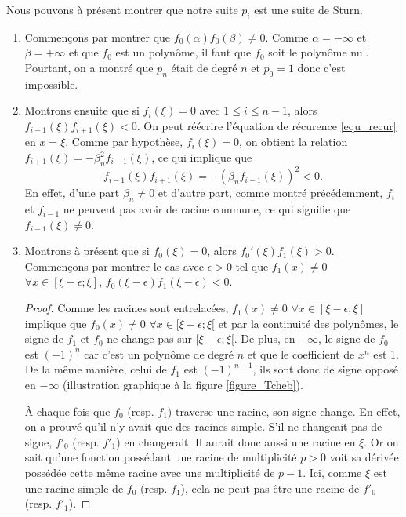 	Nous pouvons à présent montrer que notre suite $p_i$ est une suite de Sturn. 
\begin{enumerate}
  \item Commençons par montrer que $f_0(\alpha)f_0(\beta) \neq 0$.
    Comme $\alpha = -\infty$ et $\beta = + \infty$ et que $f_0$ est un polynôme,
    il faut que $f_0$ soit le polynôme nul.
    Pourtant, on a montré que $p_n$ était de degré $n$ et $p_0 = 1$ donc
    c'est impossible.
  \item Montrons ensuite que si $f_i(\xi) = 0$ avec $1 \leq i \leq n-1$,
    alors $f_{i-1}(\xi)f_{i+1}(\xi) < 0$.
    On peut réécrire l'équation de récurence \ref{equ_recur} en $x=\xi$.
    Comme par hypothèse, $f_i(\xi)=0$, on obtient la relation
    $f_{i+1}(\xi) = -\beta_n^2f_{i-1}(\xi)$, ce qui implique que
    \[ f_{i-1}(\xi)f_{i+1}(\xi) = -(\beta_nf_{i-1}(\xi))^2 < 0. \]
    En effet, d'une part $\beta_n \neq 0$ et d'autre part, comme montré précédemment, $f_i$ et $f_{i-1}$ ne peuvent
    pas avoir de racine commune, ce qui signifie que $f_{i-1}(\xi) \neq 0$.
  \item Montrons à présent que si $f_0(\xi) = 0$,
    alors $f_0'(\xi)f_1(\xi) > 0$.
    Commençons par montrer le cas avec $\epsilon > 0$ tel que
    $f_1(x) \neq 0$ $\forall x \in [\xi - \epsilon; \xi]$,
    $f_0(\xi-\epsilon) f_1(\xi-\epsilon) < 0$.
    
    \begin{proof}
      Comme les racines sont entrelacées,
      $f_1(x) \neq 0$ $\forall x \in [\xi - \epsilon; \xi]$ implique que
      $f_0(x) \neq 0$ $\forall x \in [\xi - \epsilon; \xi[$ 
      et par la continuité des polynômes, le signe de $f_1$ et $f_0$ ne change pas
      sur $[\xi - \epsilon; \xi[$.
      De plus, en $-\infty$,
      le signe de $f_0$ est $(-1)^n$ car c'est un polynôme de
      degré $n$ et que le coefficient de $x^n$ est 1.
      De la même manière, celui de $f_1$ est $(-1)^{n-1}$,
      ils sont donc de signe opposé en $-\infty$ (illustration graphique à la figure \ref{figure_Tcheb}).


      À chaque fois que $f_0$ (resp. $f_1$) traverse une racine, son signe change.
      En effet, on a prouvé qu'il n'y avait que des racines simple.
      S'il ne changeait pas de signe, $f'_0$ (resp. $f'_1$) en changerait.
      Il aurait donc aussi une racine en $\xi$.
      Or on sait qu'une fonction possédant une racine de multiplicité $p > 0$
      voit sa dérivée possédée cette même racine avec une multiplicité de $p-1$.
      Ici, comme $\xi$ est une racine simple de $f_0$ (resp. $f_1$),
      cela ne peut pas être une racine de $f'_0$ (resp. $f'_1$).


\end{proof}
\end{enumerate}

